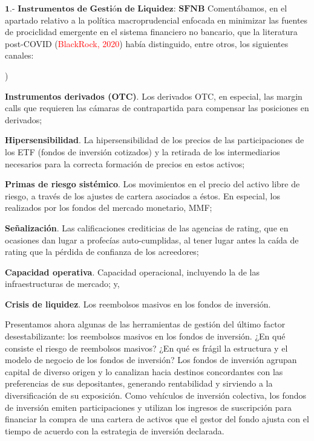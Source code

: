 \documentclass[10pt,a4paper]{article}
\newcounter{alphaitem}
\newenvironment{la}
      {\begin{list}{\alph{alphaitem})}{%
          \usecounter{alphaitem}%
          \setlength{\leftmargin}{1cm}%
          \setlength{\parskip}{3pt}%
          \setlength{\itemsep}{0pt}%
          \setlength{\parsep}{0pt}%
      }}
      {\end{list}}
\begin{document}
$\mathbf{\text{1.- Instrumentos de Gestión de Liquidez: SFNB}}$
Comentábamos, en el apartado relativo a la política macroprudencial enfocada en minimizar las fuentes de prociclidad emergente en el sistema financiero no bancario, que la literatura post-COVID (\textcolor{red}{BlackRock, 2020}) había distinguido, entre otros, los siguientes canales: 
\begin{la}
    \item \textbf{Instrumentos derivados (OTC)}. Los derivados OTC, en especial, las margin calls que requieren las cámaras de contrapartida para compensar las posiciones en derivados;
    \item \textbf{Hipersensibilidad}. La hipersensibilidad de los precios de las participaciones de los ETF (fondos de inversión cotizados) y la retirada de los intermediarios necesarios para la correcta formación de precios en estos activos;
    \item \textbf{Primas de riesgo sistémico}. Los movimientos en el precio del activo libre de riesgo, a través de los ajustes de cartera asociados a éstos. En especial, los realizados por los fondos del mercado monetario, MMF;
    \item \textbf{Señalización}. Las calificaciones crediticias de las agencias de rating, que en ocasiones dan lugar a profecías auto-cumplidas, al tener lugar antes la caída de rating que la pérdida de confianza de los acreedores;
    \item \textbf{Capacidad operativa}. Capacidad operacional, incluyendo la de las infraestructuras de mercado; y,
    \item \textbf{Crisis de liquidez}. Los reembolsos masivos en los fondos de inversión.
\end{la} 

Presentamos ahora algunas de las herramientas de gestión del último factor desestabilizante: los reembolsos masivos en los fondos de inversión. ¿En qué consiste el riesgo de reembolsos masivos? ¿En qué es frágil la estructura y el modelo de negocio de los fondos de inversión? Los fondos de inversión agrupan capital de diverso origen y lo canalizan hacia destinos concordantes con las preferencias de sus depositantes, generando rentabilidad y sirviendo a la diversificación de su exposición. Como vehículos de inversión colectiva, los fondos de inversión emiten participaciones y utilizan los ingresos de suscripción para financiar la compra de una cartera de activos que el gestor del fondo ajusta con el tiempo de acuerdo con la estrategia de inversión declarada. 
\end{document}
